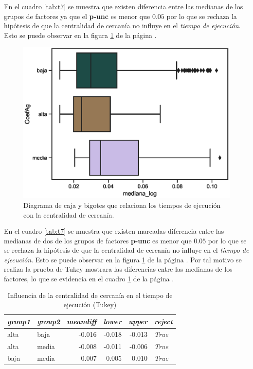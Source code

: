 \documentclass{article}
\begin{document}
En el cuadro \ref{tab:t7} se muestra que existen diferencia entre las medianas de los grupos de factores ya que el {\bf p-unc} es menor que $0.05$ por lo que se rechaza la hipótesis de que la centralidad de cercanía no influye en el \textit{tiempo de ejecución}. Esto se puede observar en la figura \ref{fig15} de la página \pageref{fig15}.

 \begin{center}
\begin{figure}[htbp]
\includegraphics[scale=0.6]{boxplot_CoefAg.eps}
\caption{Diagrama de caja y bigotes que relaciona los tiempos de ejecución con la centralidad de cercanía.}
\label{fig15}
\end{figure}
\end{center}

En el cuadro \ref{tab:t7} se muestra que existen marcadas diferencia entre las medianas de dos de los grupos de factores  {\bf p-unc} es menor que $0.05$ por lo que se se rechaza la hipótesis de que la centralidad de cercanía no influye en el \textit{tiempo de ejecución}. Esto se puede observar en la figura \ref{fig15} de la página \pageref{fig15}. Por tal motivo se realiza la prueba de Tukey mostrara las diferencias entre las medianas de los factores, lo que se evidencia en el cuadro \ref{tab:t8} de la página \pageref{tab:t8}.
\begin{table}[htbp]
  \centering
  \caption{Influencia de la centralidad de cercanía en el tiempo de ejecución (Tukey)}
    \begin{tabular}{llrrrl}
    \toprule
    \textit{\textbf{group1}} & \textit{\textbf{group2}} & \multicolumn{1}{l}{\textit{\textbf{meandiff}}} & \multicolumn{1}{l}{\textit{\textbf{lower}}} & \multicolumn{1}{l}{\textit{\textbf{upper}}} & \textit{\textbf{reject}} \\
    \midrule
    alta  & baja  & -0.016 & -0.018 & -0.013 & \textit{True} \\
    alta  & media & -0.008 & -0.011 & -0.006 & \textit{True} \\
    baja  & media & 0.007 & 0.005 & 0.010 & \textit{True} \\
    \bottomrule
    \end{tabular}%
  \label{tab:t8}%
\end{table}%
\end{document}
